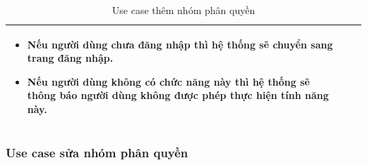 \documentclass[12pt,a4paper]{article}
\begin{document}
\begin{table}[H]
\begin{tabular}{|p{3.5cm}|p{11.5cm}|c|}
            \vspace{-.8cm}\begin{itemize}
                              \item Nếu người dùng chưa đăng nhập thì hệ thống sẽ chuyển sang trang đăng nhập.
                              \item  Nếu người dùng không có chức năng này thì hệ thống sẽ thông báo người dùng không được phép thực hiện tính năng này.
            \end{itemize}
            \\
            \hline
        \end{tabular}
        \caption{Use case thêm nhóm phân quyền }
    \end{table}


    \subsubsection*{Use case sửa nhóm phân quyền }
\end{document}
